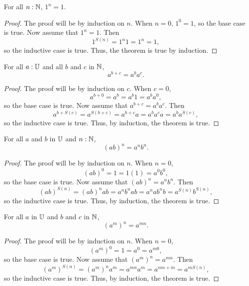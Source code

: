 \documentclass[../math.tex]{subfiles}
\begin{document}
\begin{theorem}
    For all $n : \mathbb{N}$, $1^n = 1$.
\end{theorem}
\begin{proof}
    The proof will be by induction on $n$.  When $n = 0$, $1^0 = 1$, so the base
    case is true.  Now assume that $1^n = 1$.  Then
    \[
        1^{S(n)} = 1^n1 = 1^n = 1,
    \]
    so the inductive case is true.  Thus, the theorem is true by induction.
\end{proof}

\begin{theorem}
    For all $a : \mathbb{U}$ and all $b$ and $c$ in $\mathbb{N}$,
    \[
        a^{b + c} = a^b a^c.
    \]
\end{theorem}
\begin{proof}
    The proof will be by induction on $c$.  When $c = 0$,
    \[
        a^{b + 0} = a^b = a^b1 = a^ba^0,
    \]
    so the base case is true.  Now assume that $a^{b + c} = a^b a^c$.  Then
    \[
        a^{b + S(c)} = a^{S(b + c)} = a^{b + c}a = a^b a^c a = a^b a^{S(c)},
    \]
    so the inductive case is true.  Thus, by induction, the theorem is true.
\end{proof}

\begin{theorem}
    For all $a$ and $b$ in $\mathbb{U}$ and $n : \mathbb{N}$,
    \[
        (ab)^n = a^nb^n.
    \]
\end{theorem}
\begin{proof}
    The proof will be by induction on $n$.  When $n = 0$,
    \[
        (ab)^0 = 1 = 1(1) = a^0b^0,
    \]
    so the base case is true.  Now assume that $(ab)^n = a^nb^n$.  Then
    \[
        (ab)^{S(n)} = (ab)^n ab = a^n b^n a b = a^n a b^n b = a^{S(n)} b^{S(n)},
    \]
    so the inductive case is true.  Thus, by induction, the theorem is true.
\end{proof}

\begin{theorem}
    For all $a$ in $\mathbb{U}$ and $b$ and $c$ in $\mathbb{N}$,
    \[
        (a^m)^n = a^{mn}.
    \]
\end{theorem}
\begin{proof}
    The proof will be by induction on $n$.  When $n = 0$,
    \[
        (a^m)^0 = 1 = a^0 = a^{m0},
    \]
    so the base case is true.  Now assume that $(a^m)^n = a^{mn}$.  Then
    \[
        (a^m)^{S(n)} = (a^m)^n a^m = a^{mn} a^m = a^{mn + m} = a^{mS(n)},
    \]
    so the inductive case is true.  Thus, by induction, the theorem is true.
\end{proof}
\end{document}
